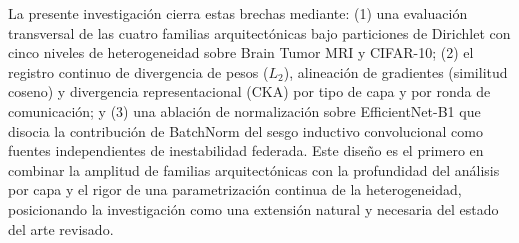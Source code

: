 La presente investigación cierra estas brechas mediante: (1) una evaluación transversal de las
cuatro familias arquitectónicas bajo particiones de Dirichlet con cinco niveles de heterogeneidad
sobre Brain Tumor MRI y CIFAR-10; (2) el registro continuo de divergencia de pesos ($L_2$),
alineación de gradientes (similitud coseno) y divergencia representacional (CKA) por tipo de capa
y por ronda de comunicación; y (3) una ablación de normalización sobre EfficientNet-B1 que disocia
la contribución de BatchNorm del sesgo inductivo convolucional como fuentes independientes de
inestabilidad federada.
Este diseño es el primero en combinar la amplitud de familias arquitectónicas con la profundidad
del análisis por capa y el rigor de una parametrización continua de la heterogeneidad,
posicionando la investigación como una extensión natural y necesaria del estado del arte revisado.

